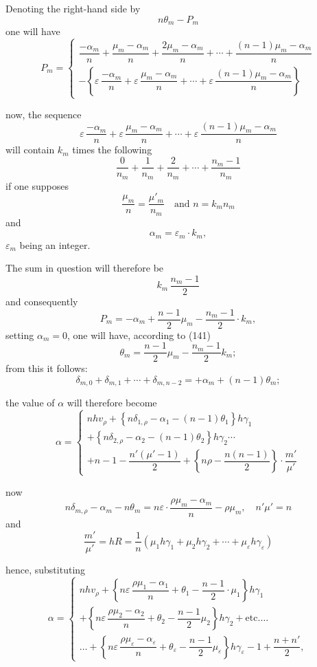 \documentclass{article}
\begin{document}
Denoting the right-hand side by
\[ n\theta_m - P_m \]
one will have
\[ P_m = \begin{cases}
\dfrac{-\alpha_m}{n} + \dfrac{\mu_m-\alpha_m}{n} + \dfrac{2\mu_m-\alpha_m}{n} + \cdots + \dfrac{(n-1)\mu_m-\alpha_m}{n} \\[1mm]
-\left\{ \varepsilon\,\dfrac{-\alpha_m}{n} + \varepsilon\,\dfrac{\mu_m-\alpha_m}{n} + \cdots + \varepsilon\,\dfrac{(n-1)\mu_m-\alpha_m}{n} \right\}
\end{cases} \]

now, the sequence
\[ \varepsilon\,\frac{-\alpha_m}{n} + \varepsilon\,\frac{\mu_m-\alpha_m}{n} + \cdots + \varepsilon\,\frac{(n-1)\mu_m-\alpha_m}{n} \]
will contain $k_m$ times the following
\[ \frac{0}{n_m} + \frac{1}{n_m} + \frac{2}{n_m} + \cdots + \frac{n_m-1}{n_m} \]
if one supposes
\[ \frac{\mu_m}{n} = \frac{\mu'_m}{n_m} \quad \text{and } n = k_m n_m \]
and
\[ \alpha_m = \varepsilon_m \cdot k_m, \tag{170} \]
$\varepsilon_m$ being an integer.

The sum in question will therefore be
\[ k_m\,\frac{n_m-1}{2} \]
and consequently
\[ P_m = -\alpha_m + \frac{n-1}{2}\mu_m - \frac{n_m-1}{2} \cdot k_m, \]
setting $\alpha_m = 0$, one will have, according to (141)
\[ \theta_m = \frac{n-1}{2}\mu_m - \frac{n_m-1}{2}k_m; \]
from this it follows:
\[ \delta_{m,0}+\delta_{m,1}+\cdots+\delta_{m,n-2} = +\alpha_m+(n-1)\theta_m; \]

the value of $\alpha$ will therefore become
\[ \alpha = \begin{cases}
nhv_\rho + \left\{n\delta_{1,\rho}-\alpha_1-(n-1)\theta_1\right\}h\gamma_1 \\
+ \left\{n\delta_{2,\rho}-\alpha_2-(n-1)\theta_2\right\}h\gamma_2 \cdots \\
+ n-1-\dfrac{n'(\mu'-1)}{2} + \left\{n\rho-\dfrac{n(n-1)}{2}\right\} \cdot \dfrac{m'}{\mu'}
\end{cases} \]

now
\[ n\delta_{m,\rho} - \alpha_m - n\theta_m = n\varepsilon \cdot \frac{\rho\mu_m-\alpha_m}{n} - \rho\mu_m, \quad n'\mu' = n \]
and
\[ \frac{m'}{\mu'} = hR = \frac{1}{n}\left(\mu_1 h\gamma_1+\mu_2 h\gamma_2+\cdots+\mu_\varepsilon h\gamma_\varepsilon\right) \]

hence, substituting
\[ \alpha = \begin{cases}
nhv_\rho + \left\{n\varepsilon\,\dfrac{\rho\mu_1-\alpha_1}{n}+\theta_1-\dfrac{n-1}{2} \cdot \mu_1\right\}h\gamma_1 \\
+ \left\{n\varepsilon\,\dfrac{\rho\mu_2-\alpha_2}{n}+\theta_2-\dfrac{n-1}{2}\mu_2\right\}h\gamma_2+\text{etc.}\ldots \\
\ldots + \left\{n\varepsilon\,\dfrac{\rho\mu_\varepsilon-\alpha_\varepsilon}{n}+\theta_\varepsilon-\dfrac{n-1}{2}\mu_\varepsilon\right\}h\gamma_\varepsilon-1+\dfrac{n+n'}{2},
\end{cases} \]
\end{document}
